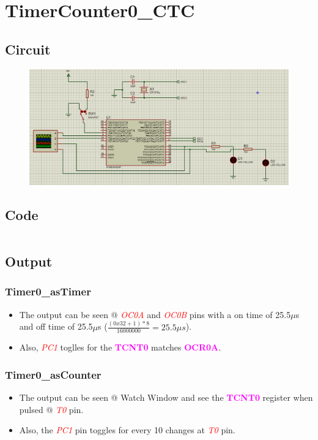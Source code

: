 \documentclass[oneside]{book}
\newcommand{\pinFormat}[1]{\emph{\textcolor{red}{#1}}}
\newcommand{\regFormat}[1]{\textbf{\textcolor{magenta}{#1}}}
\begin{document}
\section{TimerCounter0\_CTC}
\subsection{Circuit}
\begin{figure}[H]
    \centering
    \includegraphics[height=0.2\textheight]{TimerCounter0_CTC.png}
\end{figure}
\subsection{Code}
\inputminted[breaklines, bgcolor=black]{c}{../programFiles/TimerCounter0_CTC.c}
\subsection{Output}
\subsubsection{Timer0\_asTimer}
\begin{itemize}
    \item The output can be seen @ \pinFormat{OC0A} and \pinFormat{OC0B} pins with a on time of 25.5$\mu$s and off time of 25.5$\mu$s ($\frac{(0x32+1) * 8}{16000000} = 25.5\mu s$).
    \item Also, \pinFormat{PC1} toglles for the \regFormat{TCNT0} matches \regFormat{OCR0A}.
\end{itemize}
\subsubsection{Timer0\_asCounter}
\begin{itemize}
    \item The output can be seen @ Watch Window and see the \regFormat{TCNT0} register when pulsed @ \pinFormat{T0} pin.
    \item Also, the \pinFormat{PC1} pin toggles for every 10 changes at \pinFormat{T0} pin.
\end{itemize}
\end{document}
